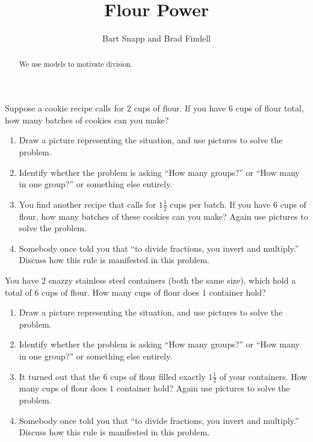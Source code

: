\documentclass[nooutcomes]{ximera}
\title{Flour Power}
\author{Bart Snapp and Brad Findell}
\begin{document}
\begin{abstract}
  We use models to motivate division.
\end{abstract}
\maketitle

\label{A:FlourPower}

\begin{problem} 
Suppose a cookie recipe calls for $2$ cups of flour. If you have $6$
cups of flour total, how many batches of cookies can you make?
\begin{enumerate}
\item Draw a picture representing the situation, and use pictures to solve the problem.
\item Identify whether the problem is asking ``How many groups?'' or ``How many in one group?'' or something else entirely.
\item You find another recipe that calls for $1\frac{1}{2}$ cups per batch. If you have $6$ cups of flour, how many batches of these cookies can you make?  Again use pictures to solve the problem.
\item Somebody once told you that ``to divide fractions, you invert and
multiply.'' Discuss how this rule is manifested in this problem.
\end{enumerate}
\end{problem}

\begin{problem} 
You have $2$ snazzy stainless steel containers (both the same size), which hold a total of
$6$ cups of flour. How many cups of flour does $1$ container hold?
\begin{enumerate}
\item Draw a picture representing the situation, and use pictures to solve the problem.
\item Identify whether the problem is asking ``How many groups?'' or ``How many in one group?'' or something else entirely.
\item It turned out that the 6 cups of flour filled exactly $1\frac{1}{2}$ of your containers.  How many cups of flour does $1$ container hold?  Again use pictures to solve the problem.
\item Somebody once told you that ``to divide fractions, you invert and
multiply.'' Discuss how this rule is manifested in this problem.
\end{enumerate}
\end{problem}
\end{document}
